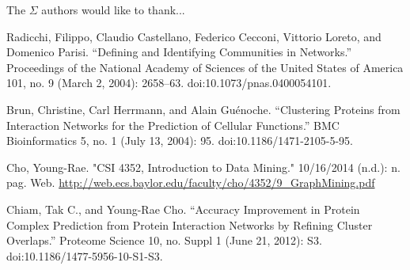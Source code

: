 \documentclass[journal]{IEEEtran}
\begin{document}
The $\Sigma$ authors would like to thank...


\ifCLASSOPTIONcaptionsoff
  \newpage
\fi





%
%
%
\begin{thebibliography}{1}
 
Radicchi, Filippo, Claudio Castellano, Federico Cecconi, Vittorio Loreto, and Domenico Parisi. “Defining and Identifying Communities in Networks.” Proceedings of the National Academy of Sciences of the United States of America 101, no. 9 (March 2, 2004): 2658–63. doi:10.1073/pnas.0400054101.

Brun, Christine, Carl Herrmann, and Alain Guénoche. “Clustering Proteins from Interaction Networks for the Prediction of Cellular Functions.” BMC Bioinformatics 5, no. 1 (July 13, 2004): 95. doi:10.1186/1471-2105-5-95.

 Cho, Young-Rae. "CSI 4352, Introduction to Data Mining." 10/16/2014 (n.d.): n. pag. Web. \url{http://web.ecs.baylor.edu/faculty/cho/4352/9_GraphMining.pdf}

 Chiam, Tak C., and Young-Rae Cho. “Accuracy Improvement in Protein Complex Prediction from Protein Interaction Networks by Refining Cluster Overlaps.” Proteome Science 10, no. Suppl 1 (June 21, 2012): S3. doi:10.1186/1477-5956-10-S1-S3.


\end{thebibliography}
\end{document}
